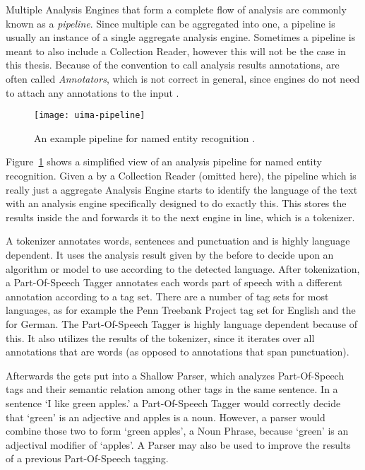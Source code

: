 Multiple Analysis Engines that form a complete flow of analysis are commonly known as a \emph{pipeline}. Since multiple \anens{} can be aggregated into one, a pipeline is usually an instance of a single aggregate analysis engine. Sometimes a pipeline is meant to also include a Collection Reader, however this will not be the case in this thesis. Because of the convention to call analysis results annotations, \anens{} are often called \emph{Annotators}, which is not correct in general, since engines do not need to attach any annotations to the input \cas{}.

\begin{figure}[hbt]
	\centering
	\texttt{[image: uima-pipeline]}
	\caption[An example UIMA pipeline for NER.]{An example \uima{} pipeline for named entity recognition \cite{uimasdk}.}
	\label{fig:uimaner}
\end{figure}

Figure~\ref{fig:uimaner} shows a simplified view of an analysis pipeline for named entity recognition. Given a \cas{} by a Collection Reader (omitted here), the pipeline which is really just a aggregate Analysis Engine starts to identify the language of the text with an analysis engine specifically designed to do exactly this. This \anen{} stores the results inside the \cas{} and forwards it to the next engine in line, which is a tokenizer. 

A tokenizer annotates words, sentences and punctuation and is highly language dependent. It uses the analysis result given by the \anen{} before to decide upon an algorithm or model to use according to the detected language. After tokenization, a Part-Of-Speech Tagger annotates each words part of speech with a different annotation according to a tag set. There are a number of tag sets for most languages, as for example the Penn Treebank Project tag set for English and the \stts{} for German. The Part-Of-Speech Tagger is highly language dependent because of this. It also utilizes the results of the tokenizer, since it iterates over all annotations that are words (as opposed to annotations that span punctuation).

Afterwards the \cas{} gets put into a Shallow Parser, which analyzes Part-Of-Speech tags and their semantic relation among other tags in the same sentence. In a sentence `I like green apples.' a Part-Of-Speech Tagger would correctly decide that `green' is an adjective and apples is a noun. However, a parser would combine those two to form `green apples', a Noun Phrase, because `green' is an adjectival modifier of `apples'. A Parser may also be used to improve the results of a previous Part-Of-Speech tagging.

